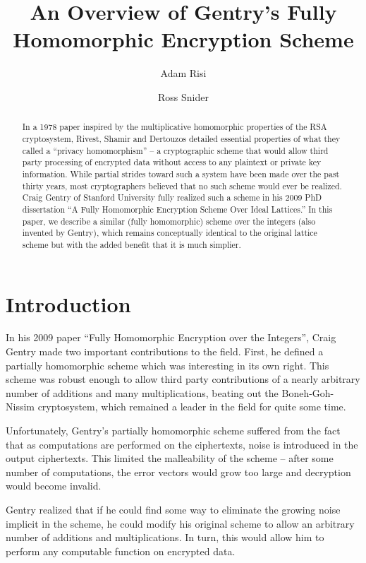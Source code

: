\documentclass[a4paper,10pt]{article}
\title{An Overview of Gentry's Fully Homomorphic Encryption Scheme}
\author{Adam Risi \and Ross Snider}
\begin{document}
\maketitle
\titlepage
\tableofcontents
\pagebreak

\begin{abstract}
In a 1978 paper\cite{rad-priv} inspired by the multiplicative
homomorphic properties of the RSA cryptosystem, Rivest, Shamir and
Dertouzos detailed essential properties of what they called a “privacy
homomorphism” – a cryptographic scheme that would allow third party
processing of encrypted data without access to any plaintext or
private key information. While partial strides toward such a system
have been made over the past thirty years, most cryptographers
believed that no such scheme would ever be realized. Craig Gentry of
Stanford University fully realized such a scheme in his 2009 PhD
dissertation “A Fully Homomorphic Encryption Scheme Over Ideal
Lattices.”\cite{gentry-lattice} In this paper, we describe a similar
(fully homomorphic) scheme over the integers (also invented by
Gentry), which remains conceptually identical to the original lattice
scheme but with the added benefit that it is much simplier.
\end{abstract}

\section{Introduction}
In his 2009 paper ``Fully Homomorphic Encryption over the
Integers''\cite{gentry-integers}, Craig Gentry made two important
contributions to the field. First, he defined a partially homomorphic
scheme which was interesting in its own right. This scheme was robust
enough to allow third party contributions of a nearly arbitrary number
of additions and many multiplications, beating out the
Boneh-Goh-Nissim cryptosystem, which remained a leader in the field
for quite some time.

Unfortunately, Gentry's partially homomorphic scheme suffered from the
fact that as computations are performed on the ciphertexts, noise is
introduced in the output ciphertexts. This limited the malleability of
the scheme -- after some number of computations, the error vectors
would grow too large and decryption would become invalid.

Gentry realized that if he could find some way to eliminate the
growing noise implicit in the scheme, he could modify his original
scheme to allow an arbitrary number of additions and
multiplications. In turn, this would allow him to perform any
computable function on encrypted data.
\end{document}
